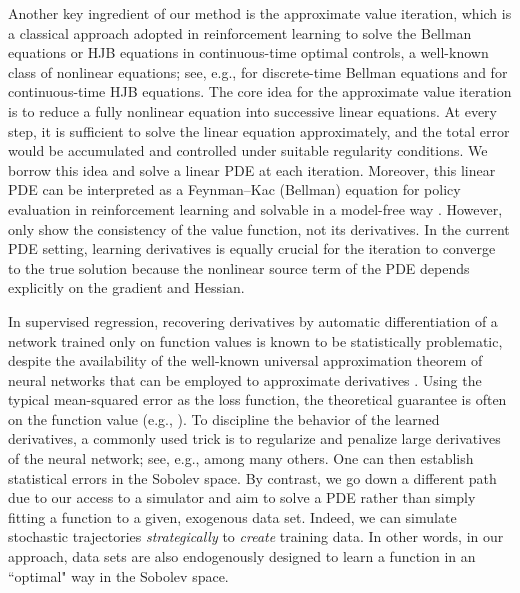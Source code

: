 \documentclass[twoside,11pt]{article}
\newcommand{\1}{\mathbf{1}}
\numberwithin{equation}{section}
\begin{document}
Another key ingredient of our method is the approximate value iteration, which is a classical approach adopted in reinforcement learning to solve the Bellman equations or HJB equations in continuous-time optimal controls, a well-known class of nonlinear equations; see, e.g., \citet{bertsekas1996neuro,sutton1998reinforcement} for discrete-time Bellman equations and \citet{yong1999stochastic,fleming2006controlled,pham2009continuous} for continuous-time HJB equations. The core idea for the approximate value iteration is to reduce a fully nonlinear equation into successive linear equations. At every step, it is sufficient to solve the linear equation approximately, and the total error would be accumulated and controlled under suitable regularity conditions. We borrow this idea and solve a linear PDE at each iteration. Moreover, this linear PDE can be interpreted as a Feynman--Kac (Bellman) equation for policy evaluation in reinforcement learning and solvable in a model-free way \citep{jia2022policy}. However, \citet{jia2022policy} only show the consistency of the value function, not its derivatives. In the current PDE setting, learning derivatives is equally crucial for the iteration to converge to the true solution because the nonlinear source term of the PDE depends explicitly on the gradient and Hessian.

In supervised regression, recovering derivatives by automatic differentiation of a network trained only on function values is known to be statistically problematic,
despite the availability of  the well-known universal approximation theorem of neural networks that can be employed  to approximate derivatives \citep{hornik1990universal,siegel2023optimal}. Using the typical mean-squared error as the loss function, the theoretical guarantee is often on the function value (e.g., \citealt{barron1994approximation}). To discipline the behavior of the learned derivatives, a commonly used trick is to regularize and penalize large derivatives of the neural network; see, e.g., \citet{kim2004smoothing,fischer2020sobolev} among  many others. One can then establish statistical errors in the Sobolev space. By contrast, we go down a different path due to our access to a simulator and aim to solve a PDE rather than simply fitting a function to a given, exogenous data set. Indeed, we can simulate stochastic trajectories {\it strategically} to {\it create} training data. In other words, in our approach, data sets are also endogenously designed to learn a function in an ``optimal" way in the Sobolev space.
\end{document}
